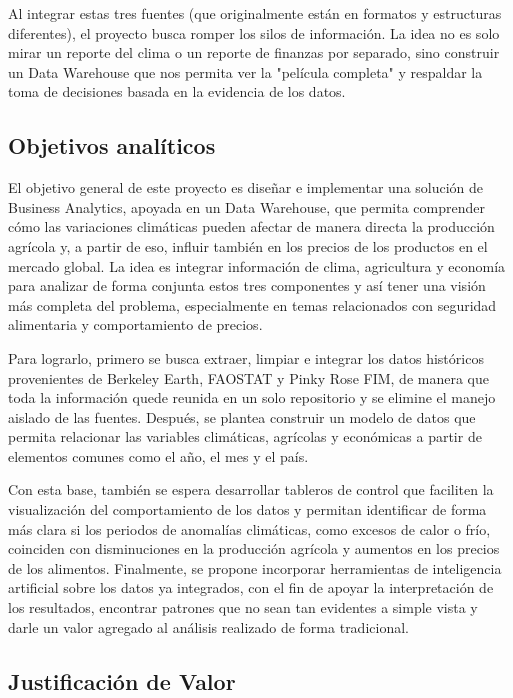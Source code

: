 \documentclass[12pt,letterpaper]{article}
\begin{document}
\noindent Al integrar estas tres fuentes (que originalmente están en formatos y estructuras diferentes), el proyecto busca romper los silos de información. La idea no es solo mirar un reporte del clima o un reporte de finanzas por separado, sino construir un Data Warehouse que nos permita ver la "película completa" y respaldar la toma de decisiones basada en la evidencia de los datos.
\subsection*{Objetivos analíticos}

\noindent El objetivo general de este proyecto es diseñar e implementar una solución de  Business Analytics, apoyada en un Data Warehouse, que permita comprender cómo las variaciones climáticas pueden afectar de manera directa la producción agrícola y, a partir de eso, influir también en los precios de los productos en el mercado global. La idea es integrar información de clima, agricultura y economía para analizar de forma conjunta estos tres componentes y así tener una visión más completa del problema, especialmente en temas relacionados con seguridad alimentaria y comportamiento de precios.

\noindent Para lograrlo, primero se busca extraer, limpiar e integrar los datos históricos provenientes de Berkeley Earth, FAOSTAT y Pinky Rose FIM, de manera que toda la información quede reunida en un solo repositorio y se elimine el manejo aislado de las fuentes. Después, se plantea construir un modelo de datos que permita relacionar las variables climáticas, agrícolas y económicas a partir de elementos comunes como el año, el mes y el país. 

\noindent Con esta base, también se espera desarrollar tableros de control que faciliten la visualización del comportamiento de los datos y permitan identificar de forma más clara si los periodos de anomalías climáticas, como excesos de calor o frío, coinciden con disminuciones en la producción agrícola y aumentos en los precios de los alimentos. Finalmente, se propone incorporar herramientas de inteligencia artificial sobre los datos ya integrados, con el fin de apoyar la interpretación de los resultados, encontrar patrones que no sean tan evidentes a simple vista y darle un valor agregado al análisis realizado de forma tradicional.

\subsection*{Justificación de Valor}
\end{document}
